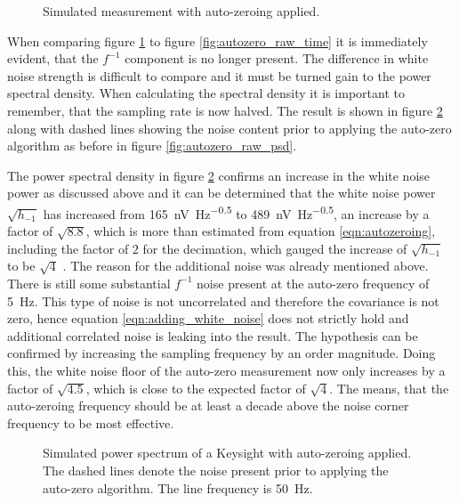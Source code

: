 \begin{figure}[hb]
    \centering
    
    \caption{Simulated measurement with auto-zeroing applied.}
    \label{fig:autozero_time}
\end{figure}

When comparing figure \ref{fig:autozero_time} to figure \ref{fig:autozero_raw_time} it is immediately evident, that the $f^{-1}$ component is no longer present. The difference in white noise strength is difficult to compare and it must be turned gain to the power spectral density. When calculating the spectral density it is important to remember, that the sampling rate is now halved. The result is shown in figure \ref{fig:autozero_psd} along with dashed lines showing the noise content prior to applying the auto-zero algorithm as before in figure \ref{fig:autozero_raw_psd}.

The power spectral density in figure \ref{fig:autozero_psd} confirms an increase in the white noise power as discussed above and it can be determined that the white noise power $\sqrt{h_{-1}}$ has increased from \qty[power-half-as-sqrt, per-mode=symbol]{165}{\nV \Hz\tothe{-0.5}} to \qty[power-half-as-sqrt, per-mode=symbol]{489}{\nV \Hz\tothe{-0.5}}, an increase by a factor of $\sqrt{8.8}$, which is more than estimated from equation \ref{eqn:autozeroing}, including the factor of $2$ for the decimation, which gauged the increase of $\sqrt{h_{-1}}$ to be $\sqrt{4}$ . The reason for the additional noise was already mentioned above. There is still some substantial $f^{-1}$ noise present at the auto-zero frequency of \qty{5}{\Hz}. This type of noise is not uncorrelated and therefore the covariance is not zero, hence equation \ref{eqn:adding_white_noise} does not strictly hold and additional correlated noise is leaking into the result. The hypothesis can be confirmed by increasing the sampling frequency by an order magnitude. Doing this, the white noise floor of the auto-zero measurement now only increases by a factor of $\sqrt{4.5}$, which is close to the expected factor of $\sqrt{4}$. The means, that the auto-zeroing frequency should be at least a decade above the noise corner frequency to be most effective.

\begin{figure}[ht]
    \centering
    
    \caption{Simulated power spectrum of a Keysight  with auto-zeroing applied. The dashed lines denote the noise present prior to applying the auto-zero algorithm. The line frequency is \qty{50}{\Hz}.}
    \label{fig:autozero_psd}
\end{figure}

